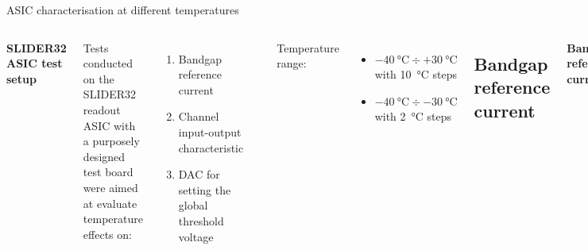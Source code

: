 \documentclass[aspectratio=169,xcolor=dvipsnames,handout]{beamer} %
\begin{document}

\begin{frame}{ASIC characterisation at different temperatures}
\fontsize{8.5pt}{1}\selectfont
    \begin{columns}[T]
        \vskip0.3cm
        \textbf{SLIDER32 ASIC test setup}\\
        \vskip0.15cm
        
        Tests conducted on the SLIDER32 readout ASIC with a purposely designed test board were aimed at evaluate temperature effects on:
        \begin{enumerate}
            \item Bandgap reference current
            \item Channel input-output characteristic
            \item DAC for setting the global threshold voltage
        \end{enumerate}

        \vskip0.05cm
        \includegraphics[width=0.95\textwidth]{images/temperature_effects/test_setup_test_board_csavrefgm_530mv.png}
        \vskip0.2cm

        Temperature range: 
        \begin{itemize}
            \item $\SI{-40}{\celsius} \div +\SI{30}{\celsius}$ with \SI{10}{\celsius} steps
            \item $\SI{-40}{\celsius} \div \SI{-30}{\celsius}$ with \SI{2}{\celsius} steps
        \end{itemize}

    \subsection{Bandgap reference current}
        \addtolength{\leftmargini}{\labelsep}
        \vskip0.3cm
        \textbf{Bandgap reference current}\\
        \vskip0.15cm
    

\end{columns}
\end{frame}
\end{document}
